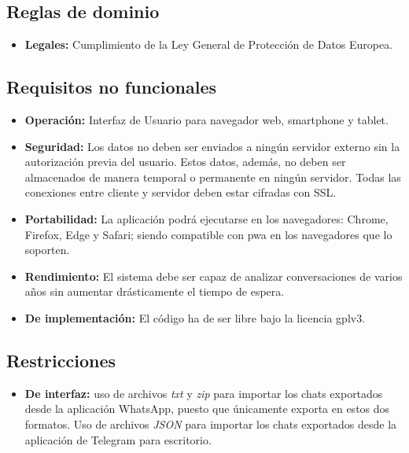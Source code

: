 \subsection{Reglas de dominio}

\begin{itemize}
	\item \textbf{Legales:} Cumplimiento de la Ley General de Protección de Datos Europea.
\end{itemize}

\subsection{Requisitos no funcionales}

\begin{itemize}
	\item \textbf{Operación:} Interfaz de Usuario para navegador web, smartphone y tablet.
	
	\item \textbf{Seguridad:} Los datos no deben ser enviados a ningún servidor externo sin la autorización previa del usuario. Estos datos, además, no deben ser almacenados de manera temporal o permanente en ningún servidor. Todas las conexiones entre cliente y servidor deben estar cifradas con SSL.
	
	\item \textbf{Portabilidad:} La aplicación podrá ejecutarse en los navegadores: Chrome, Firefox, Edge y Safari; siendo compatible con \acrshort{pwa} en los navegadores que lo soporten.
	
	\item \textbf{Rendimiento:} El sistema debe ser capaz de analizar conversaciones de varios años sin aumentar drásticamente el tiempo de espera.
	
	\item \textbf{De implementación:} El código ha de ser libre bajo la licencia \acrfull{gplv3}.
\end{itemize}

\subsection{Restricciones}

\begin{itemize}
	\item \textbf{De interfaz:} uso de archivos \textit{txt} y \textit{zip} para importar los chats exportados desde la aplicación WhatsApp, puesto que únicamente exporta en estos dos formatos. Uso de archivos \textit{JSON} para importar los chats exportados desde la aplicación de Telegram para escritorio.
\end{itemize}










